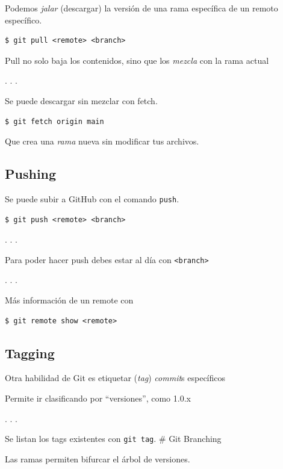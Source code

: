 Podemos \emph{jalar} (descargar) la versión de una rama específica de un
remoto específico.

\begin{lstlisting}
$ git pull <remote> <branch>
\end{lstlisting}

Pull no solo baja los contenidos, sino que los \emph{mezcla} con la rama
actual

. . .

Se puede descargar sin mezclar con fetch.

\begin{lstlisting}
$ git fetch origin main
\end{lstlisting}

Que crea una \emph{rama} nueva sin modificar tus archivos.

\subsection{Pushing}

Se puede subir a GitHub con el comando \passthrough{\lstinline!push!}.

\begin{lstlisting}
$ git push <remote> <branch>
\end{lstlisting}

. . .

Para poder hacer push debes estar al día con
\passthrough{\lstinline!<branch>!}

. . .

Más información de un remote con

\begin{lstlisting}
$ git remote show <remote>
\end{lstlisting}

\subsection{Tagging}

Otra habilidad de Git es etiquetar (\emph{tag}) \emph{commit}s
específicos

Permite ir clasificando por ``versiones'', como 1.0.x

. . .

Se listan los tags existentes con \passthrough{\lstinline!git tag!}. \#
Git Branching

Las ramas permiten bifurcar el árbol de versiones.

\subsection{}


